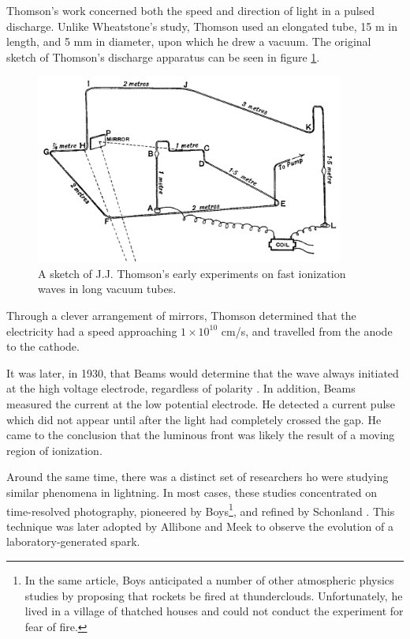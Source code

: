 Thomson's work concerned both the speed and direction of light in a pulsed
discharge. Unlike Wheatstone's study, Thomson used an elongated tube, 15 m in
length, and 5 mm in diameter, upon which he drew a vacuum. The original sketch
of Thomson's discharge apparatus can be seen in figure \ref{fig:thomson}.
\begin{figure}
  \centering
  \includegraphics[width=4in]{chapters/introduction/figures/thomson.png}
  \caption{A sketch of J.J. Thomson's early experiments on fast ionization
  waves in long vacuum tubes.}\label{fig:thomson}
\end{figure}
Through a clever arrangement of mirrors, Thomson determined that the electricity
had a speed approaching $1\times10^{10}$ cm/s, and travelled from the anode to
the cathode.

It was later, in 1930, that Beams would determine that the wave always initiated
at the high voltage electrode, regardless of polarity \cite{Beams1930}. In
addition, Beams measured the current at the low potential electrode. He detected
a current pulse which did not appear until after the light had completely
crossed the gap. He came to the conclusion that the luminous front was likely
the result of a moving region of ionization.

Around the same time, there was a distinct set of researchers ho were studying
similar phenomena in lightning. In most cases, these studies concentrated on
time-resolved photography, pioneered by Boys\footnote{In the same article, Boys
anticipated a number of other atmospheric physics studies by proposing that
rockets be fired at thunderclouds. Unfortunately, he lived in a village of
thatched houses and could not conduct the experiment for fear of
fire.}\cite{Boys1926}, and refined by Schonland \cite{Schonland1935}. This
technique was later adopted by Allibone and Meek \cite{Allibone1938} to observe
the evolution of a laboratory-generated spark.

